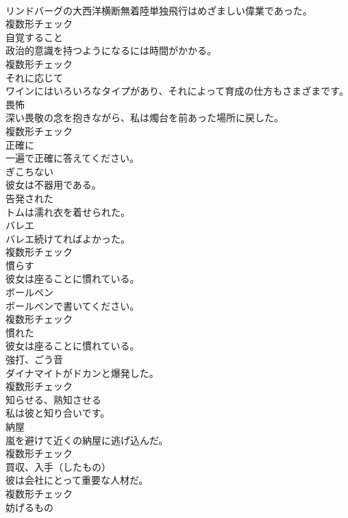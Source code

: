\documentclass[8pt]{extreport}
\begin{document}
\begin{CJK}{UTF8}{min}
\\	リンドバーグの大西洋横断無着陸単独飛行はめざましい偉業であった。	
\\	複数形チェック
\\	[名詞]	自覚すること	
\\	政治的意識を持つようになるには時間がかかる。	
\\	複数形チェック
\\	[副詞]	それに応じて	
\\	ワインにはいろいろなタイプがあり、それによって育成の仕方もさまざまです。	
\\	[名詞]	畏怖	
\\	深い畏敬の念を抱きながら、私は燭台を前あった場所に戻した。	
\\	複数形チェック
\\	[副詞]	正確に	
\\	一遍で正確に答えてください。	
\\	[形容詞]	ぎこちない	
\\	彼女は不器用である。	
\\	[形容詞]	告発された	
\\	トムは濡れ衣を着せられた。	
\\	[名詞]	バレエ	
\\	バレエ続けてればよかった。	
\\	複数形チェック
\\	[動詞]	慣らす	
\\	彼女は座ることに慣れている。	
\\	[名詞]	ボールペン	
\\	ボールペンで書いてください。	
\\	複数形チェック
\\	[形容詞]	慣れた	
\\	彼女は座ることに慣れている。	
\\	[名詞]	強打、ごう音	
\\	ダイナマイトがドカンと爆発した。	
\\	複数形チェック
\\	[動詞]	知らせる、熟知させる	
\\	私は彼と知り合いです。	
\\	[名詞]	納屋	
\\	嵐を避けて近くの納屋に逃げ込んだ。	
\\	複数形チェック
\\	[名詞]	買収、入手（したもの）	
\\	彼は会社にとって重要な人材だ。	
\\	複数形チェック
\\	[名詞]	妨げるもの	

\end{CJK}
\end{document}
